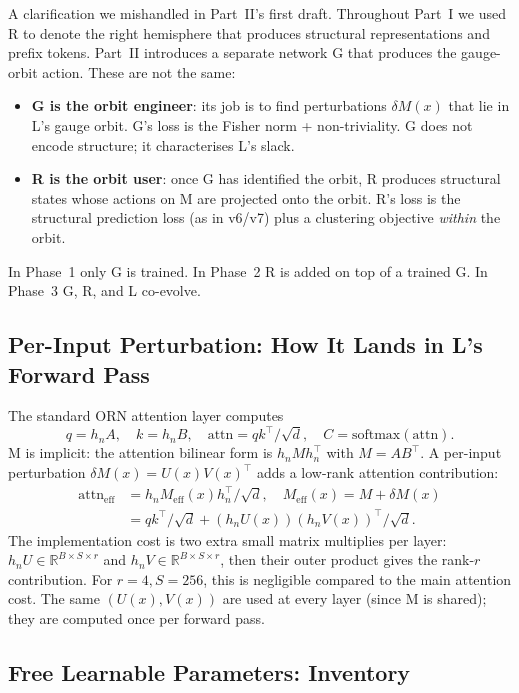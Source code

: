 \documentclass[11pt, a4paper]{article}
\theoremstyle{plain}
\theoremstyle{definition}
\theoremstyle{remark}
\begin{document}
A clarification we mishandled in Part~II's first draft.
Throughout Part~I we used R to denote the right hemisphere that produces structural representations and prefix tokens.
Part~II introduces a separate network G that produces the gauge-orbit action.
These are not the same:
\begin{itemize}[nosep]
\item \textbf{G is the orbit engineer}: its job is to find perturbations $\delta M(x)$ that lie in L's gauge orbit. G's loss is the Fisher norm + non-triviality. G does not encode structure; it characterises L's slack.
\item \textbf{R is the orbit user}: once G has identified the orbit, R produces structural states whose actions on M are projected onto the orbit. R's loss is the structural prediction loss (as in v6/v7) plus a clustering objective \emph{within} the orbit.
\end{itemize}
In Phase~1 only G is trained. In Phase~2 R is added on top of a trained G. In Phase~3 G, R, and L co-evolve.

\subsection{Per-Input Perturbation: How It Lands in L's Forward Pass}

The standard ORN attention layer computes
\[
q = h_{n} A,\quad k = h_{n} B,\quad \mathrm{attn} = q k^{\!\top}/\sqrt{d}, \quad C = \mathrm{softmax}(\mathrm{attn}).
\]
M is implicit: the attention bilinear form is $h_{n} M h_{n}^{\!\top}$ with $M = AB^{\!\top}$.
A per-input perturbation $\delta M(x) = U(x) V(x)^{\!\top}$ adds a low-rank attention contribution:
\begin{align}
\mathrm{attn}_{\text{eff}} &= h_{n} M_{\text{eff}}(x) h_{n}^{\!\top} / \sqrt{d}, \quad M_{\text{eff}}(x) = M + \delta M(x) \\
&= q k^{\!\top}/\sqrt{d} + (h_{n} U(x))(h_{n} V(x))^{\!\top}/\sqrt{d}.
\end{align}
The implementation cost is two extra small matrix multiplies per layer: $h_{n} U \in \mathbb{R}^{B \times S \times r}$ and $h_{n} V \in \mathbb{R}^{B \times S \times r}$, then their outer product gives the rank-$r$ contribution.
For $r = 4, S = 256$, this is negligible compared to the main attention cost.
The same $(U(x), V(x))$ are used at every layer (since M is shared); they are computed once per forward pass.

\subsection{Free Learnable Parameters: Inventory}
\end{document}
